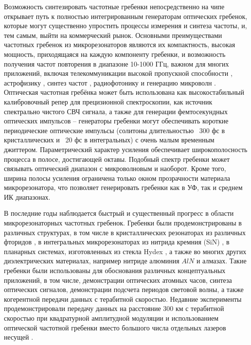 Возможность синтезировать частотные гребенки непосредственно на чипе открывает путь к полностью интегрированным генераторам оптических гребенок, которые могут существенно упростить процессы измерения и синтеза частоты, и, тем самым, выйти на коммерческий рынок. Основными преимуществами частотных гребенок из микрорезонаторов являются их компактность, высокая мощность, приходящаяся на каждую компоненту гребенки, и возможность получения частот повторения в диапазоне 10-1000 ГГц, важном для многих приложений, включая телекоммуникации высокой пропускной способности \cite{Pfeifle2014}, астрофизику \cite{Glenday2015}, синтез частот \cite{Ferdous2011}, радиофотонику и генерацию микроволн \cite{Xue2016,Savchenkov2008}. Оптическая частотная гребёнка может быть использована как высокостабильный калибровочный репер для прецизионной спектроскопии, как источник спектрально чистого СВЧ сигнала, а также для генерации фемтосекундных оптических импульсов – генераторы гребенки могут обеспечивать короткие периодические оптические импульсы (солитоны длительностью ~300 фс в кристаллических и ~20 фс в интегральных) с очень малым временным джиттером. Параметрический характер усиления обеспечивает широкополосность процесса в полосе, достигающей октавы. Подобный спектр гребенки может связывать оптический диапазон с микроволновым и наоборот. Кроме того, ширина полосы усиления ограничена только окном прозрачности материала микрорезонатора, что позволяет генерировать гребенки как в УФ, так и среднем ИК диапазонах.


В последние годы наблюдается быстрый и существенный прогресс в области микрорезонаторных частотных гребенок. Гребенки были продемонстрированы в различных структурах, в том числе в кристаллических резонаторах из различных фторидов \cite{Savchenkov2008,Grudinin2012,Jost2015,Liang2011,DelHaye2011,Chembo2010,Grudinin2009}, в интегральных микрорезонаторах из нитрида кремния (SiN) \cite{Levy2010,Okawachi2011,Johnson2012,Huang2015}, в планарных системах, изготовленных из стекла Hydex \cite{Moss2013,Razzari2010}, а также во многих других диэлектрических материалах, например нитриде алюминия  $AlN$ и алмазах\cite{Jung2013,Hausmann2014}. Такие гребенки были использованы для обоснования различных концептуальных приложений, в том числе, демонстрации оптических атомных часов, синтеза оптических сигналов, демонстрации подсчета периодов световой волны, а также когерентной передачи данных с терабитной скоростью. Недавние эксперименты продемонстрировали передачу данных на расстояние 300 км с терабитной скоростью при квадратурной амплитудной модуляции и использованием оптической частотной гребенки вместо большого числа отдельных лазеров несущей \cite{Pfeifle2014}.


